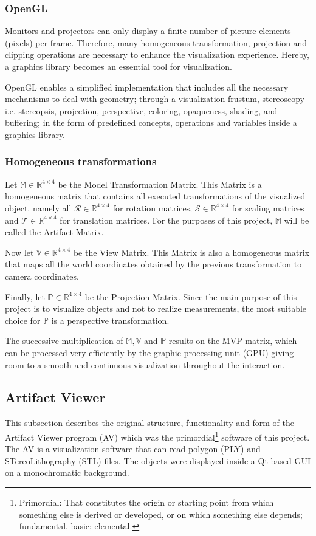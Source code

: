 \documentclass[12pt]{extarticle}
\newcommand{\R}{\mathbb{R}}
\newcommand{\Ro}{\mathcal{R}}
\newcommand{\Sc}{\mathcal{S}}
\newcommand{\Tr}{\mathcal{T}}
\newcommand{\Mod}{\mathbb{M}}
\newcommand{\Pro}{\mathbb{P}}
\newcommand{\Vie}{\mathbb{V}}
\begin{document}
\subsubsection {OpenGL}\label{subsec{OGL}}
Monitors and projectors can only display a finite number of picture elements (pixels) per frame.  Therefore, many homogeneous transformation, projection and clipping operations are necessary to enhance the visualization experience. Hereby, a graphics library becomes an essential tool for visualization.

OpenGL enables a simplified implementation that includes all the necessary mechanisms to deal with geometry; through a visualization frustum, stereoscopy i.e. stereopsis, projection, perspective, coloring, opaqueness, shading, and buffering; in the form of predefined concepts, operations and variables inside a graphics library.

\subsubsection {Homogeneous transformations}\label{subsubsec Hom}
Let $\Mod\in \R ^{4\times 4}$ be the Model Transformation Matrix. This Matrix is a homogeneous matrix that contains all executed transformations of the visualized object. namely all $\Ro \in \R ^{4\times 4}$ for rotation matrices, $\Sc \in \R ^{4\times 4}$ for scaling matrices and $\Tr \in \R ^{4\times 4}$ for translation matrices. For the purposes of this project, $\Mod$ will be called the Artifact Matrix.\cite{RST}

Now let $\Vie\in \R ^{4\times 4}$ be the View Matrix. This Matrix is also a homogeneous matrix that maps all the world coordinates obtained by the previous transformation to camera coordinates.

Finally, let $\Pro\in \R ^{4\times 4}$ be the Projection Matrix. Since the main purpose of this project is to visualize objects and not to realize measurements, the most suitable choice for $\Pro$ is a perspective transformation.

The successive multiplication of $\Mod, \Vie$ and $\Pro$  results on the MVP matrix, which can be processed very efficiently by the graphic processing unit (GPU) giving room to a smooth and continuous visualization throughout the interaction.

\subsection{Artifact Viewer}
This subsection describes the original structure, functionality and form of the Artifact Viewer program (AV) which was the primordial\footnote{Primordial: That constitutes the origin or starting point from which something else is derived or developed, or on which something else depends; fundamental, basic; elemental.\cite{oed}} software of this project. The AV is a visualization software that can read polygon (PLY) and STereoLithography (STL) files. The objects were displayed inside a Qt-based GUI on a monochromatic background.
\end{document}

